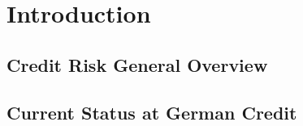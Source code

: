 \chapter{Introduction} \label{ch2}

\section{Credit Risk General Overview}\label{2.1}

\section{Current Status at German Credit}\label{2.2}


